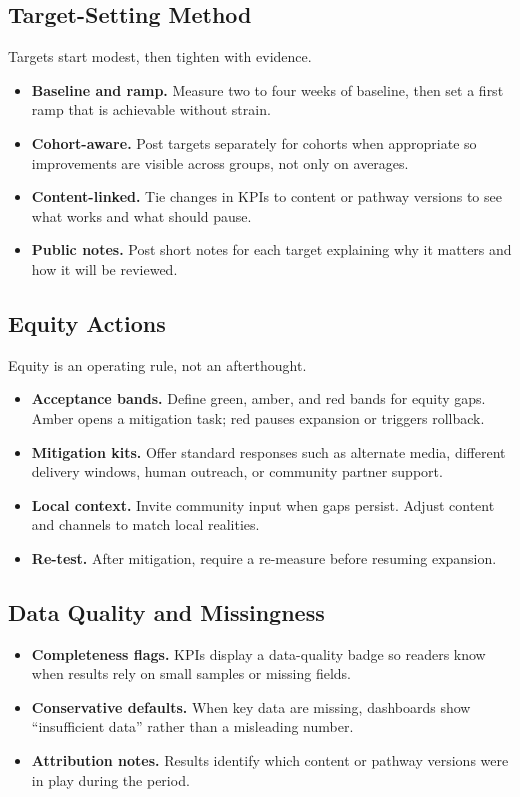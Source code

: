 \documentclass[12pt]{article}
\begin{document}
\subsection*{Target-Setting Method}
Targets start modest, then tighten with evidence.
\begin{itemize}[leftmargin=*]
  \item \textbf{Baseline and ramp.} Measure two to four weeks of baseline, then set a first ramp that is achievable without strain.
  \item \textbf{Cohort-aware.} Post targets separately for cohorts when appropriate so improvements are visible across groups, not only on averages.
  \item \textbf{Content-linked.} Tie changes in KPIs to content or pathway versions to see what works and what should pause.
  \item \textbf{Public notes.} Post short notes for each target explaining why it matters and how it will be reviewed.
\end{itemize}

\subsection*{Equity Actions}
Equity is an operating rule, not an afterthought.
\begin{itemize}[leftmargin=*]
  \item \textbf{Acceptance bands.} Define green, amber, and red bands for equity gaps. Amber opens a mitigation task; red pauses expansion or triggers rollback.
  \item \textbf{Mitigation kits.} Offer standard responses such as alternate media, different delivery windows, human outreach, or community partner support.
  \item \textbf{Local context.} Invite community input when gaps persist. Adjust content and channels to match local realities.
  \item \textbf{Re-test.} After mitigation, require a re-measure before resuming expansion.
\end{itemize}

\subsection*{Data Quality and Missingness}
\begin{itemize}[leftmargin=*]
  \item \textbf{Completeness flags.} KPIs display a data-quality badge so readers know when results rely on small samples or missing fields.
  \item \textbf{Conservative defaults.} When key data are missing, dashboards show “insufficient data” rather than a misleading number.
  \item \textbf{Attribution notes.} Results identify which content or pathway versions were in play during the period.
\end{itemize}
\end{document}
